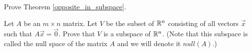 \documentclass{ximera}
\begin{document}
\begin{problem}\label{pr:opposite_in_subspace}
Prove Theorem \ref{opposite_in_subspace}.
\end{problem}

\begin{problem}\label{pr:null(A)_is_subspace}
Let $A$ be an $m \times n$ matrix.  Let $V$ be the subset of $\mathbb{R}^n$ consisting of all vectors $\vec{x}$ such that $A \vec{x} = \vec{0}$.  Prove that $V$ is a subspace of $\mathbb{R}^n$.  (Note that this subspace is called the null space of the matrix $A$ and we will denote it $null(A)$.)
\end{problem}
\end{document}
